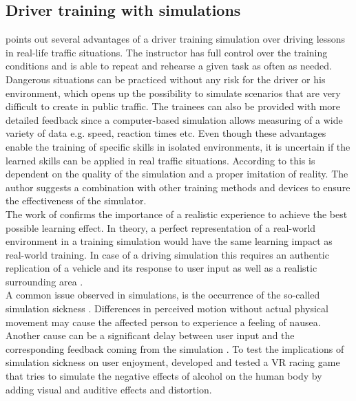 %
\subsection{Driver training with simulations}
\label{section:driver training}
%

\textcite[1]{vlakveld2005use} points out several advantages of a driver training simulation over driving lessons in real-life traffic situations.
The instructor has full control over the training conditions and is able to repeat and rehearse a given task as often as needed.
Dangerous situations can be practiced without any risk for the driver or his environment, which opens up the possibility to simulate scenarios that are very difficult to create in public traffic.
The trainees can also be provided with more detailed feedback since a computer-based simulation allows measuring of a wide variety of data e.g. speed, reaction times etc.
Even though these advantages enable the training of specific skills in isolated environments, it is uncertain if the learned skills can be applied in real traffic situations. 
According to \textcite[2]{vlakveld2005use} this is dependent on the quality of the simulation and a proper imitation of reality. 
The author suggests a combination with other training methods and devices to ensure the effectiveness of the simulator.
\\
The work of \textcite{waller1998transfer} confirms the importance of a realistic experience to achieve the best possible learning effect.
In theory, a perfect representation of a real-world environment in a training simulation would have the same learning impact as real-world training.
In case of a driving simulation this requires an authentic replication of a vehicle and its response to user input as well as a realistic surrounding area \autocite[130]{waller1998transfer}.
\\
A common issue observed in simulations, is the occurrence of the so-called simulation sickness \autocite[]{hettinger1992visually}.
Differences in perceived motion without actual physical movement may cause the affected person to experience a feeling of nausea. 
Another cause can be a significant delay between user input and the corresponding feedback coming from the simulation \autocite[2]{kemeny2014driving}.
To test the implications of simulation sickness on user enjoyment, \textcite{von2016cyber} developed and tested a VR racing game that tries to simulate the negative effects of alcohol on the human body by adding visual and auditive effects and distortion. 
